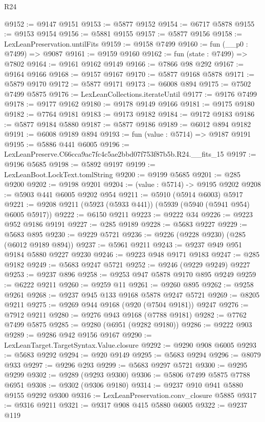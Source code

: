 \begin{lexlean}{R24}
\begin{coremodule}
@9152 := @9147 @9151
@9153 := @5877 @9152
@9154 := @6717 @5878
@9155 := @9153 @9154
@9156 := @5881 @9155
@9157 := @5877 @9156
@9158 := LexLeanPreservation.untilFits
@9159 := @9158 @7499
@9160 := fun (__p0 : @7499) => @9087
@9161 := @9159 @9160
@9162 := fun (state : @7499) => @7802
@9164 := @9161 @9162 @9149
@9166 := @7866 @98 @292
@9167 := @9164 @9166
@9168 := @9157 @9167
@9170 := @5877 @9168 @5878
@9171 := @5879 @9170
@9172 := @5877 @9171
@9173 := @6008 @894
@9175 := @7502 @7499 @5875
@9176 := LexLeanCollections.iterateUntil
@9177 := @9176 @7499
@9178 := @9177 @9162
@9180 := @9178 @9149 @9166
@9181 := @9175 @9180
@9182 := @7764 @9181
@9183 := @9173 @9182
@9184 := @9172 @9183
@9186 := @5877 @9184 @5880
@9187 := @5877 @9186
@9189 := @6012 @894 @9182
@9191 := @6008 @9189 @894
@9193 := fun (value : @5714) => @9187 @9191
@9195 := @5886 @441 @6005
@9196 := LexLeanPreserve.C66cca9ac7fc4c5ae2bbd07f753f87b5b.R24.__fits_15
@9197 := @9196 @5685
@9198 := @5892 @9197
@9199 := LexLeanBoot.LockText.tomlString
@9200 := @9199 @5685
@9201 := @285 @9200
@9202 := @9198 @9201
@9204 := (value : @5714) -> @9195 @9202
@9208 := @5903 @441 @6005 @9202 @954
@9211 := @5910 (@5914 @6003) @5917
@9221 := @9208 @9211 (@5923 (@5933 @441)) (@5939 (@5940 (@5941 @954) @6005 @5917))
@9222 := @6150 @9211
@9223 := @9222 @34
@9226 := @9223 @952 @9186 @9191
@9227 := @285 @9189
@9228 := @5683 @9227
@9229 := @5683 @895
@9230 := @9229 @5721
@9236 := @9226 (@9228 @9230) (@285 (@6012 @9189 @894))
@9237 := @5961 @9211
@9243 := @9237 @949 @951 @9184 @5880 @9227 @9230
@9246 := @9223 @948 @9171 @9183
@9247 := @285 @9182
@9249 := @5683 @9247 @5721
@9252 := @9246 (@9229 @9249) @9227
@9253 := @9237 @896
@9258 := @9253 @947 @5878 @9170 @895 @9249
@9259 := @6222 @9211
@9260 := @9259 @11
@9261 := @9260 @895
@9262 := @9258 @9261
@9268 := @9237 @945 @133 @9168 @5878 @9247 @5721
@9269 := @8205 @9211
@9275 := @9269 @944 @9168 (@920 (@7504 @9181)) @9247
@9276 := @7912 @9211
@9280 := @9276 @943 @9168 (@7788 @9181)
@9282 := @7762 @7499 @5875
@9285 := @9280 (@6951 (@9282 @9180))
@9286 := @9222 @903
@9289 := @9286 @942 @9156 @9167
@9290 := LexLeanTarget.TargetSyntax.Value.closure
@9292 := @9290 @908 @6005
@9293 := @5683 @9292
@9294 := @920 @9149
@9295 := @5683 @9294
@9296 := @8079 @933
@9297 := @9296 @293
@9299 := @5683 @9297 @5721
@9300 := @9295 @9299
@9302 := @9289 (@9293 @9300)
@9306 := @5806 @7499 @5875 @7788 @6951
@9308 := @9302 (@9306 @9180)
@9314 := @9237 @910 @941 @5880 @9155 @9292 @9300
@9316 := LexLeanPreservation.conv_closure @5885
@9317 := @9316 @9211
@9321 := @9317 @908 @415 @5880 @6005
@9322 := @9237 @119

\end{coremodule}
\end{lexlean}
